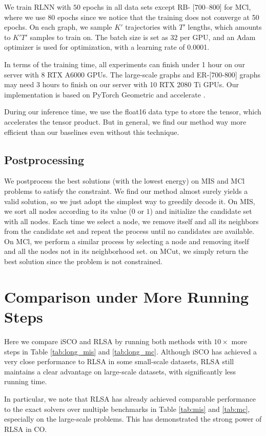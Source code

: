 We train RLNN with $50$ epochs in all data sets except RB- [$700$--$800$] for MCl, where we use 80 epochs since we notice that the training does not converge at 50 epochs.  On each graph, we sample $K'$ trajectories with $T'$ lengths, which amounts to $K'T'$ samples to train on. The batch size is set as 32 per GPU, and an Adam optimizer is used for optimization, with a learning rate of 0.0001.

In terms of the training time, all experiments can finish under 1 hour on our server with 8 RTX A6000 GPUs. The large-scale graphs and ER-[$700$-$800$] graphs may need 3 hours to finish on our server with 10 RTX 2080 Ti GPUs. Our implementation is based on PyTorch Geometric \citep{Fey/Lenssen/2019} and accelerate \citep{accelerate}.

During our inference time, we use the float16 data type to store the tensor, which accelerates the tensor product. But in general, we find our method way more efficient than our baselines even without this technique.
\subsection{Postprocessing}
We postprocess the best solutions (with the lowest energy) on MIS and MCl problems to satisfy the constraint. We find our method almost surely yields a valid solution, so we just adopt the simplest way to greedily decode it. On MIS, we sort all nodes according to its value ($0$ or $1$) and initialize the candidate set with all nodes. Each time we select a node, we remove itself and all its neighbors  from the candidate set and repeat the process until no candidates are available. On MCl, we perform a similar process by selecting a node and removing itself and all the nodes not in its neighborhood set. on MCut, we simply return the best solution since the problem is not constrained.


\section{Comparison under More Running Steps}
\label{ref:longer}
Here we compare iSCO \citep{sun2023revisiting} and RLSA by running both methods with $10\times$ more steps in Table \ref{tab:long_mis} and \ref{tab:long_mc}. Although iSCO has achieved a very close performance to RLSA in some small-scale datasets, RLSA still maintains a clear advantage on large-scale datasets, with significantly less running time.

In particular, we note that RLSA has already achieved comparable performance to the exact solvers over multiple benchmarks in Table \ref{tab:mis} and \ref{tab:mc}, especially on the large-scale problems. This has demonstrated the strong power of RLSA in CO.


